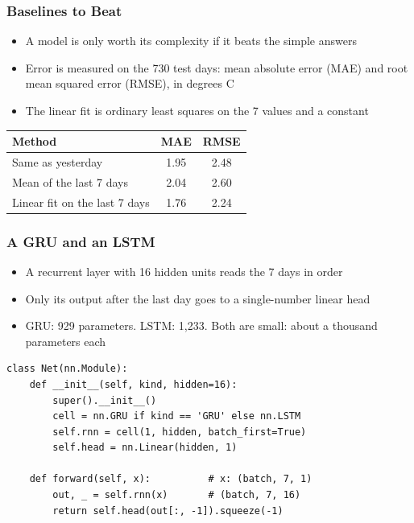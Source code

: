 \begin{frame}[fragile]\frametitle{Baselines to Beat}
\begin{itemize}
\item A model is only worth its complexity if it beats the simple answers
\item Error is measured on the 730 test days: mean absolute error (MAE) and root mean squared error (RMSE), in degrees C
\item The linear fit is ordinary least squares on the 7 values and a constant
\end{itemize}
\begin{center}
\small
\begin{tabular}{lcc}
\hline
Method & MAE & RMSE \\
\hline
Same as yesterday & 1.95 & 2.48 \\
Mean of the last 7 days & 2.04 & 2.60 \\
Linear fit on the last 7 days & 1.76 & 2.24 \\
\hline
\end{tabular}
\end{center}
\end{frame}

\begin{frame}[fragile]\frametitle{A GRU and an LSTM}
\begin{itemize}
\item A recurrent layer with 16 hidden units reads the 7 days in order
\item Only its output after the last day goes to a single-number linear head
\item GRU: 929 parameters. LSTM: 1,233. Both are small: about a thousand parameters each
\end{itemize}
\begin{lstlisting}
class Net(nn.Module):
    def __init__(self, kind, hidden=16):
        super().__init__()
        cell = nn.GRU if kind == 'GRU' else nn.LSTM
        self.rnn = cell(1, hidden, batch_first=True)
        self.head = nn.Linear(hidden, 1)

    def forward(self, x):          # x: (batch, 7, 1)
        out, _ = self.rnn(x)       # (batch, 7, 16)
        return self.head(out[:, -1]).squeeze(-1)
\end{lstlisting}
\end{frame}

